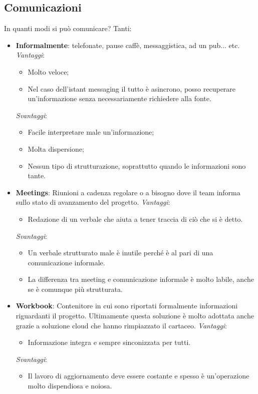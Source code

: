 \subsection{Comunicazioni}
In quanti modi si può comunicare? Tanti:
\begin{itemize}
	\item \textbf{Informalmente}: telefonate, pause caffè, messaggistica, ad un pub... etc.\newline
	\textit{Vantaggi}:
	\begin{itemize}
		\item Molto veloce;
		\item Nel caso dell'istant messaging il tutto è asincrono, posso recuperare un'informazione senza necessariamente richiedere alla fonte.
	\end{itemize}
	\textit{Svantaggi}:
	\begin{itemize}
		\item Facile interpretare male un'informazione;
		\item Molta dispersione;
		\item Nessun tipo di strutturazione, soprattutto quando le informazioni sono tante.
	\end{itemize}
	\item \textbf{Meetings}: Riunioni a cadenza regolare o a bisogno dove il team informa sullo stato di avanzamento del progetto.
	\textit{Vantaggi}:
	\begin{itemize}
		\item Redazione di un verbale che aiuta a tener traccia di ciò che si è detto.
	\end{itemize}
	\textit{Svantaggi}:
	\begin{itemize}
		\item Un verbale strutturato male è inutile perché è al pari di una comunicazione informale.
		\item La differenza tra meeting e comunicazione informale è molto labile, anche se è comunque più strutturata.
	\end{itemize}
	\item \textbf{Workbook}: Contenitore in cui sono riportati formalmente informazioni riguardanti il progetto. Ultimamente questa soluzione è molto adottata anche grazie a soluzione cloud che hanno rimpiazzato il cartaceo.\newline
	\textit{Vantaggi}:
	\begin{itemize}
		\item Informazione integra e sempre sinconizzata per tutti.
	\end{itemize}
	\textit{Svantaggi}:
	\begin{itemize}
		\item Il lavoro di aggiornamento deve essere costante e spesso è un'operazione molto dispendiosa e noiosa.
	\end{itemize}
\end{itemize}
